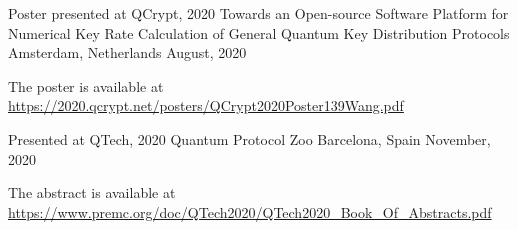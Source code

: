

\begin{cventries}

  \cventry
    {Poster presented at QCrypt, 2020} %
    {Towards an Open-source Software Platform for Numerical Key Rate Calculation of General Quantum Key Distribution Protocols} %
    {Amsterdam, Netherlands} %
    {August, 2020} %
    {
      \begin{cvitems} %
        \item {The poster is available at \href{https://2020.qcrypt.net/posters/QCrypt2020Poster139Wang.pdf}{https://2020.qcrypt.net/posters/QCrypt2020Poster139Wang.pdf}}
      \end{cvitems}
    }

  \cventry
    {Presented at QTech, 2020} %
    {Quantum Protocol Zoo} %
    {Barcelona, Spain} %
    {November, 2020} %
    {
      \begin{cvitems} %
        \item {The abstract is available at \href{https://www.premc.org/doc/QTech2020/QTech2020_Book_Of_Abstracts.pdf}{https://www.premc.org/doc/QTech2020/QTech2020\_Book\_Of\_Abstracts.pdf}}
      \end{cvitems}
    }

\end{cventries}
